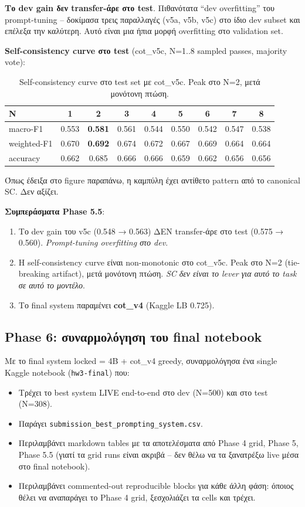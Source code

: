 \documentclass[12pt]{fphw}
\begin{document}
\textbf{Το dev gain δεν transfer-άρε στο test}. Πιθανότατα ``dev overfitting'' του prompt-tuning -- δοκίμασα τρεις παραλλαγές (v5a, v5b, v5c) στο ίδιο dev subset και επέλεξα την καλύτερη. Αυτό είναι μια ήπια μορφή overfitting στο validation set.

\textbf{Self-consistency curve στο test} (cot\_v5c, N=1..8 sampled passes, majority vote):

\begin{table}[H]
\centering
\small
\begin{tabular}{lcccccccc}
\toprule
N & 1 & 2 & 3 & 4 & 5 & 6 & 7 & 8 \\
\midrule
macro-F1 & 0.553 & \textbf{0.581} & 0.561 & 0.544 & 0.550 & 0.542 & 0.547 & 0.538 \\
weighted-F1 & 0.670 & \textbf{0.692} & 0.674 & 0.672 & 0.667 & 0.669 & 0.664 & 0.664 \\
accuracy & 0.662 & 0.685 & 0.666 & 0.666 & 0.659 & 0.662 & 0.656 & 0.656 \\
\bottomrule
\end{tabular}
\caption{Self-consistency curve στο test set με cot\_v5c. Peak στο N=2, μετά μονότονη πτώση.}
\end{table}

Όπως έδειξα στο figure παραπάνω, η καμπύλη έχει αντίθετο pattern από το canonical SC. Δεν αξίζει.

\textbf{Συμπεράσματα Phase 5.5}:

\begin{enumerate}
    \item Το dev gain του v5c (0.548 → 0.563) ΔΕΝ transfer-άρε στο test (0.575 → 0.560). \emph{Prompt-tuning overfitting στο dev}.
    \item Η self-consistency curve είναι non-monotonic στο cot\_v5c. Peak στο N=2 (tie-breaking artifact), μετά μονότονη πτώση. \emph{SC δεν είναι το lever για αυτό το task σε αυτό το μοντέλο}.
    \item Το final system παραμένει \textbf{cot\_v4} (Kaggle LB 0.725).
\end{enumerate}

\subsection{Phase 6: συναρμολόγηση του final notebook}

Με το final system locked = 4B + cot\_v4 greedy, συναρμολόγησα ένα single Kaggle notebook (\texttt{hw3-final}) που:

\begin{itemize}
    \item Τρέχει το best system LIVE end-to-end στο dev (N=500) και στο test (N=308).
    \item Παράγει \texttt{submission\_best\_prompting\_system.csv}.
    \item Περιλαμβάνει markdown tables με τα αποτελέσματα από Phase 4 grid, Phase 5, Phase 5.5 (γιατί τα grid runs είναι ακριβά -- δεν θέλω να τα ξανατρέξω live μέσα στο final notebook).
    \item Περιλαμβάνει commented-out reproducible blocks για κάθε άλλη φάση: όποιος θέλει να αναπαράγει το Phase 4 grid, ξεσχολιάζει τα cells και τρέχει.
\end{itemize}
\end{document}
